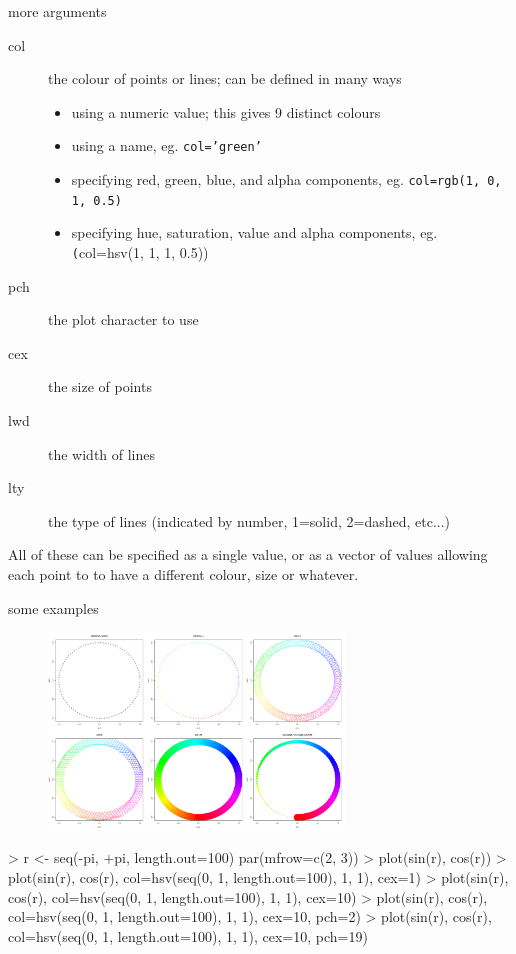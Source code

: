 \documentclass[pdf]{beamer}
\begin{document}
\begin{frame}[fragile]{more arguments}
  
  
  \begin{description}
  \item[col] the colour of points or lines; can be defined in many ways
    \begin{itemize}
    \item using a numeric value; this gives 9 distinct colours
    \item using a name, eg. \texttt{col='green'}
    \item specifying red, green, blue, and alpha components, eg. \texttt{col=rgb(1, 0, 1, 0.5)}
    \item specifying hue, saturation, value and alpha components, eg. \texttt(col=hsv(1, 1, 1, 0.5))
    \end{itemize}
  \item[pch] the plot character to use
  \item[cex] the size of points
  \item[lwd] the width of lines
  \item[lty] the type of lines (indicated by number, 1=solid, 2=dashed, etc...)
  \end{description}
  
  All of these can be specified as a single value, or as a vector of values
  allowing each point to to have a different colour, size or whatever.

\end{frame}

\begin{frame}[fragile]{some examples}
  \begin{figure}[ht]
    \includegraphics[width=0.7\textwidth]{images/circles.pdf}
  \end{figure}
  \begin{rcode}
    > r <- seq(-pi, +pi, length.out=100)
    par(mfrow=c(2, 3))
    > plot(sin(r), cos(r))
    > plot(sin(r), cos(r), col=hsv(seq(0, 1, length.out=100), 1, 1), cex=1)                            
    > plot(sin(r), cos(r), col=hsv(seq(0, 1, length.out=100), 1, 1), cex=10)
    > plot(sin(r), cos(r), col=hsv(seq(0, 1, length.out=100), 1, 1), cex=10, pch=2)
    > plot(sin(r), cos(r), col=hsv(seq(0, 1, length.out=100), 1, 1), cex=10, pch=19)
  \end{rcode}
\end{frame}
\end{document}

